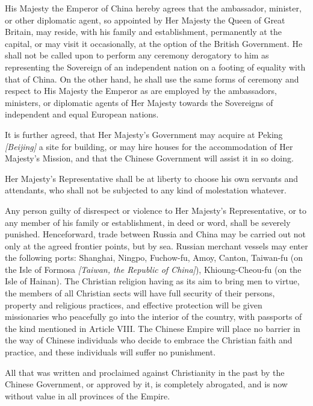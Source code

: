 \begin{fancyquote}
	\vspace*{0.5em}
	\vspace*{0.5em}
	His Majesty the Emperor of China hereby agrees that the ambassador, minister, or other diplomatic agent, so appointed by Her Majesty the Queen of Great Britain, may reside, with his family and establishment, permanently at the capital, or may visit it occasionally, at the option of the British Government. He shall not be called upon to perform any ceremony derogatory to him as representing the Sovereign of an independent nation on a footing of equality with that of China. On the other hand, he shall use the same forms of ceremony and respect to His Majesty the Emperor as are employed by the ambassadors, ministers, or diplomatic agents of Her Majesty towards the Sovereigns of independent and equal European nations.
	
	It is further agreed, that Her Majesty's Government may acquire at Peking \emph{[Beijing]} a site for building, or may hire houses for the accommodation of Her Majesty's Mission, and that the Chinese Government will assist it in so doing.
	
	Her Majesty's Representative shall be at liberty to choose his own servants and attendants, who shall not be subjected to any kind of molestation whatever.
	
	Any person guilty of disrespect or violence to Her Majesty's Representative, or to any member of his family or establishment, in deed or word, shall be severely punished.
	\emph{\autocite{HKPress:1912}}
	Henceforward, trade between Russia and China may be carried out not only at the agreed frontier points, but by sea. Russian merchant vessels may enter the following ports: Shanghai, Ningpo, Fuchow-fu, Amoy, Canton, Taiwan-fu (on the Isle of Formosa \emph{[Taiwan, the Republic of China]}), Khioung-Cheou-fu (on the Isle of Hainan).
	\emph{\autocite{Adamov:1952}}
	\clearpage
	The Christian religion having as its aim to bring men to virtue, the members of all Christian sects will have full security of their persons, property and religious practices, and effective protection will be given missionaries who peacefully go into the interior of the country, with passports of the kind mentioned in Article VIII. The Chinese Empire will place no barrier in the way of Chinese individuals who decide to embrace the Christian faith and practice, and these individuals will suffer no punishment.

	All that was written and proclaimed against Christianity in the past by the Chinese Government, or approved by it, is completely abrogated, and is now without value in all provinces of the Empire. \emph{\autocite{Chassiron:1861}}
\end{fancyquote}
